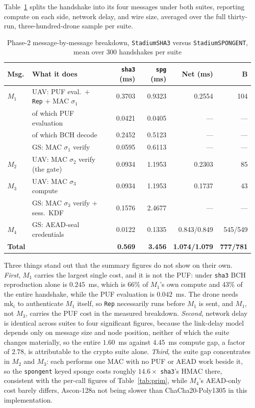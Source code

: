 \documentclass[journal]{IEEEtran}
\begin{document}
Table~\ref{tab:msg} splits the handshake into its four messages under both
suites, reporting compute on each side, network delay, and wire size, averaged
over the full thirty-run, three-hundred-drone sample per suite.

\begin{table}[H]
\centering
\caption{Phase-2 message-by-message breakdown, \texttt{StadiumSHA3} versus
\texttt{StadiumSPONGENT}, mean over 300 handshakes per suite}
\label{tab:msg}
\tiny
\setlength{\tabcolsep}{2pt}
\begin{tabular}{@{}p{0.8cm}p{4.3cm}rrrr@{}}
\toprule
\textbf{Msg.} & \textbf{What it does} & \textbf{\texttt{sha3} (ms)} &
\textbf{\texttt{spg} (ms)} & \textbf{Net (ms)} & \textbf{B} \\
\midrule
$M_1$ & UAV: PUF eval.\ $+$ \texttt{Rep} $+$ MAC $\sigma_1$ & 0.3703 & 0.9323 & 0.2554 & 104 \\
      & \quad of which PUF evaluation & 0.0421 & 0.0405 & --- & --- \\
      & \quad of which BCH decode & 0.2452 & 0.5123 & --- & --- \\
      & GS: MAC $\sigma_1$ verify & 0.0595 & 0.6113 & --- & --- \\
$M_2$ & UAV: MAC $\sigma_2$ verify (the gate) & 0.0934 & 1.1953 & 0.2303 & 85 \\
$M_3$ & UAV: MAC $\sigma_3$ compute & 0.0934 & 1.1953 & 0.1737 & 43 \\
      & GS: MAC $\sigma_3$ verify $+$ sess.\ KDF & 0.1576 & 2.4677 & --- & --- \\
$M_4$ & GS: AEAD-seal credentials & 0.0122 & 0.1335 & 0.843/0.849 & 545/549 \\
\midrule
\textbf{Total} & & \textbf{0.569} & \textbf{3.456} & \textbf{1.074/1.079} & \textbf{777/781} \\
\bottomrule
\end{tabular}
\end{table}

Three things stand out that the summary figures do not show on their own.
\emph{First}, $M_1$ carries the largest single cost, and it is not the PUF:
under \texttt{sha3} BCH reproduction alone is $0.245$~ms, which is 66\% of
$M_1$'s own compute
and 43\% of the entire handshake, while the PUF evaluation is $0.042$~ms. The
drone needs $\text{mk}_i$ to
authenticate $M_1$ itself, so \texttt{Rep} necessarily runs before $M_1$ is
sent, and $M_1$, not $M_3$, carries the PUF cost in the measured breakdown.
\emph{Second}, network delay is identical across suites to four significant
figures, because the link-delay model depends only on message size and node
position, neither of which the suite changes materially, so the entire
$1.60$~ms against $4.45$~ms compute gap, a factor of $2.78$, is attributable to
the crypto suite alone. \emph{Third}, the suite gap concentrates in $M_2$ and
$M_3$: each performs one MAC with no PUF or AEAD work beside it, so the
\texttt{spongent} keyed sponge costs roughly $14.6\times$ \texttt{sha3}'s HMAC
there, consistent with the per-call figures of Table~\ref{tab:prim}, while
$M_4$'s AEAD-only cost barely differs, Ascon-128a not being slower than
ChaCha20-Poly1305 in this implementation.
\end{document}
